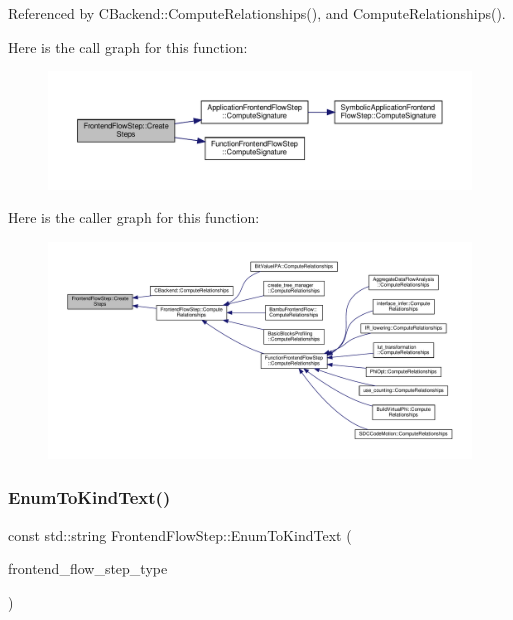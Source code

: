 Referenced by C\+Backend\+::\+Compute\+Relationships(), and Compute\+Relationships().

Here is the call graph for this function\+:
\nopagebreak
\begin{figure}[H]
\begin{center}
\leavevmode
\includegraphics[width=350pt]{d9/d37/classFrontendFlowStep_ad3ca11749bede7a0f026d2cb6c9f6cba_cgraph}
\end{center}
\end{figure}
Here is the caller graph for this function\+:
\nopagebreak
\begin{figure}[H]
\begin{center}
\leavevmode
\includegraphics[width=350pt]{d9/d37/classFrontendFlowStep_ad3ca11749bede7a0f026d2cb6c9f6cba_icgraph}
\end{center}
\end{figure}
\mbox{\label{classFrontendFlowStep_ad2069034c4947a128d22f73cf40e17e0}} 
\subsubsection{\texorpdfstring{Enum\+To\+Kind\+Text()}{EnumToKindText()}}
{\footnotesize\ttfamily const std\+::string Frontend\+Flow\+Step\+::\+Enum\+To\+Kind\+Text (\begin{DoxyParamCaption}\item[{const \hyperlink{frontend__flow__step_8hpp_afeb3716c693d2b2e4ed3e6d04c3b63bb}{Frontend\+Flow\+Step\+Type}}]{frontend\+\_\+flow\+\_\+step\+\_\+type }\end{DoxyParamCaption})\hspace{0.3cm}{\ttfamily [static]}}



